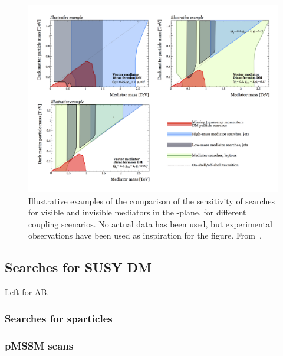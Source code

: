 
\begin{figure}[!htpb]
\includegraphics[width=\textwidth]{figures/DMSummary.png}
\caption{Illustrative examples of the comparison of the sensitivity of searches for visible and invisible mediators in the \mdm-\mmed plane, for different coupling scenarios. No actual data has been used, but experimental observations have been used as inspiration for the figure. From~\cite{AnotherWikipedia}.}
\label{fig:sensitivityComparison}
\end{figure}

 




\subsection{Searches for SUSY DM}
\label{sec:results_SUSYSearches}

Left for AB. 

\subsubsection{Searches for sparticles}

\subsubsection{pMSSM scans}


